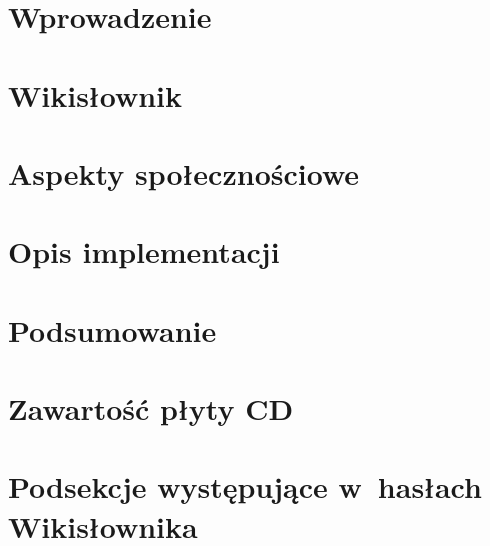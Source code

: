 

\chapter{Wprowadzenie}


\chapter{Wikisłownik}


\chapter{Aspekty społecznościowe}


\chapter{Opis implementacji}


\chapter{Podsumowanie}


\appendix
\chapter{Zawartość płyty CD}


\chapter{Podsekcje występujące w~hasłach Wikisłownika}


%


